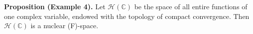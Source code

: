 \textbf{Proposition (Example 4).} Let $\mathcal{H}(\mathbb{C})$ be the space of all entire functions of one complex variable, endowed with the topology of compact convergence. Then $\mathcal{H}(\mathbb{C})$ is a nuclear (F)-space.

